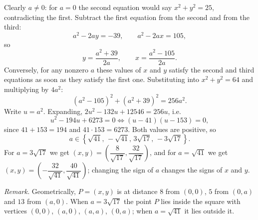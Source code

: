 Clearly $a\ne0$: for $a=0$ the second equation would say $x^2+y^2=25$, contradicting the first. Subtract the first equation from the second and from the third:
\[a^2-2ay=-39,\qquad a^2-2ax=105,\]
so
\[y=\dfrac{a^2+39}{2a},\qquad x=\dfrac{a^2-105}{2a}.\]
Conversely, for any nonzero $a$ these values of $x$ and $y$ satisfy the second and third equations as soon as they satisfy the first one. Substituting into $x^2+y^2=64$ and multiplying by $4a^2$:
\[\left(a^2-105\right)^2+\left(a^2+39\right)^2=256a^2.\]
Write $u=a^2$. Expanding, $2u^2-132u+12546=256u$, i.e.
\[u^2-194u+6273=0\iff(u-41)(u-153)=0,\]
since $41+153=194$ and $41\cdot153=6273$. Both values are positive, so
\[\boxed{a\in\left\{\sqrt{41},\,-\sqrt{41},\,3\sqrt{17},\,-3\sqrt{17}\right\}}.\]
For $a=3\sqrt{17}$ we get $(x,y)=\left(\dfrac{8}{\sqrt{17}},\dfrac{32}{\sqrt{17}}\right)$, and for $a=\sqrt{41}$ we get $(x,y)=\left(-\dfrac{32}{\sqrt{41}},\dfrac{40}{\sqrt{41}}\right)$; changing the sign of $a$ changes the signs of $x$ and $y$.

\emph{Remark.} Geometrically, $P=(x,y)$ is at distance $8$ from $(0,0)$, $5$ from $(0,a)$ and $13$ from $(a,0)$. When $a=3\sqrt{17}$ the point $P$ lies inside the square with vertices $(0,0)$, $(a,0)$, $(a,a)$, $(0,a)$; when $a=\sqrt{41}$ it lies outside it.
